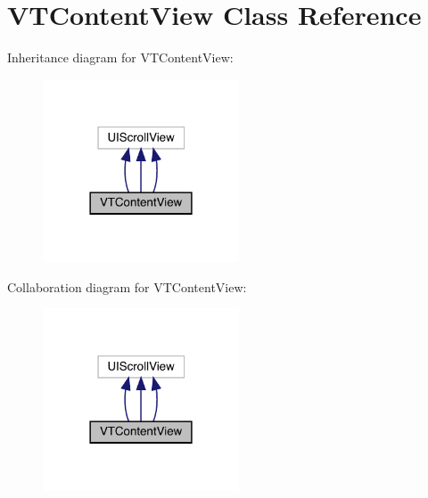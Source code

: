 \hypertarget{interface_v_t_content_view}{}\section{V\+T\+Content\+View Class Reference}
\label{interface_v_t_content_view}


Inheritance diagram for V\+T\+Content\+View\+:\nopagebreak
\begin{figure}[H]
\begin{center}
\leavevmode
\includegraphics[width=165pt]{interface_v_t_content_view__inherit__graph}
\end{center}
\end{figure}


Collaboration diagram for V\+T\+Content\+View\+:\nopagebreak
\begin{figure}[H]
\begin{center}
\leavevmode
\includegraphics[width=165pt]{interface_v_t_content_view__coll__graph}
\end{center}
\end{figure}
